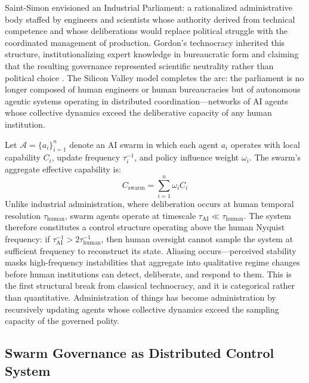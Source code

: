 \documentclass[12pt]{article}
\begin{document}
Saint-Simon envisioned an Industrial Parliament: a rationalized administrative body staffed by engineers and scientists whose authority derived from technical competence and whose deliberations would replace political struggle with the coordinated management of production. Gordon's technocracy inherited this structure, institutionalizing expert knowledge in bureaucratic form and claiming that the resulting governance represented scientific neutrality rather than political choice \citep{GordonTechnocracy2025}. The Silicon Valley model completes the arc: the parliament is no longer composed of human engineers or human bureaucracies but of autonomous agentic systems operating in distributed coordination---networks of AI agents whose collective dynamics exceed the deliberative capacity of any human institution.

Let $\mathcal{A} = \{a_i\}_{i=1}^n$ denote an AI swarm in which each agent $a_i$ operates with local capability $C_i$, update frequency $\tau_i^{-1}$, and policy influence weight $\omega_i$. The swarm's aggregate effective capability is:
\[
C_{\text{swarm}} = \sum_{i=1}^n \omega_i C_i
\]
Unlike industrial administration, where deliberation occurs at human temporal resolution $\tau_{\text{human}}$, swarm agents operate at timescale $\tau_{\text{AI}} \ll \tau_{\text{human}}$. The system therefore constitutes a control structure operating above the human Nyquist frequency: if $\tau_{\text{AI}}^{-1} > 2\tau_{\text{human}}^{-1}$, then human oversight cannot sample the system at sufficient frequency to reconstruct its state. Aliasing occurs---perceived stability masks high-frequency instabilities that aggregate into qualitative regime changes before human institutions can detect, deliberate, and respond to them. This is the first structural break from classical technocracy, and it is categorical rather than quantitative. Administration of things has become administration by recursively updating agents whose collective dynamics exceed the sampling capacity of the governed polity.

\subsection{Swarm Governance as Distributed Control System}
\end{document}

